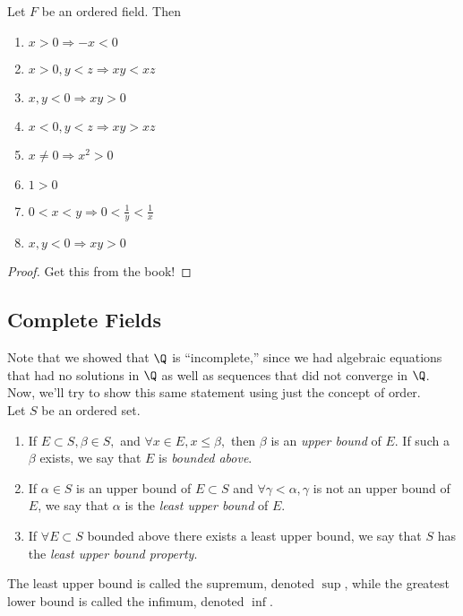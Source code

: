 \documentclass{notes}
\begin{document}
\begin{proposition}
  Let $F$ be an ordered field. Then 
  \begin{enumerate}
    \item $x > 0 \Rightarrow -x < 0$
    \item $x > 0, y<z \Rightarrow xy < xz$
    \item $x,y < 0 \Rightarrow xy > 0$
    \item $x < 0, y < z \Rightarrow xy > xz$
    \item $x\neq 0 \Rightarrow x^2 > 0$
    \item $1 > 0$
    \item $0 < x < y \Rightarrow 0 < \frac{1}{y} < \frac{1}{x}$
    \item $x,y < 0 \Rightarrow xy > 0$
  \end{enumerate}
\end{proposition}

\begin{proof}
  Get this from the book!
\end{proof}

\subsection{Complete Fields}
Note that we showed that $\Q$ is ``incomplete,'' since we had algebraic equations that had no solutions
in $\Q$ as well as sequences that did not converge in $\Q$. Now, we'll try to show this same statement 
using just the concept of order. \\

Let $S$ be an ordered set. 
\begin{enumerate}
  \item If $E\subset S, \beta\in S,$ and $\forall x\in E, x\leq\beta,$ then $\beta$ is an \emph{upper bound}
    of $E$. If such a $\beta$ exists, we say that $E$ is \emph{bounded above}.
  \item If $\alpha\in S$ is an upper bound of $E\subset S$ and $\forall \gamma < \alpha, \gamma$ is not
    an upper bound of $E$, we say that $\alpha$ is the \emph{least upper bound} of $E$.
  \item If $\forall E\subset S$ bounded above there exists a least upper bound, we say that $S$ has the
    \emph{least upper bound property}.
\end{enumerate}
The least upper bound is called the supremum, denoted $\sup$, while the greatest lower bound is called the
infimum, denoted $\inf$. \\
\end{document}
